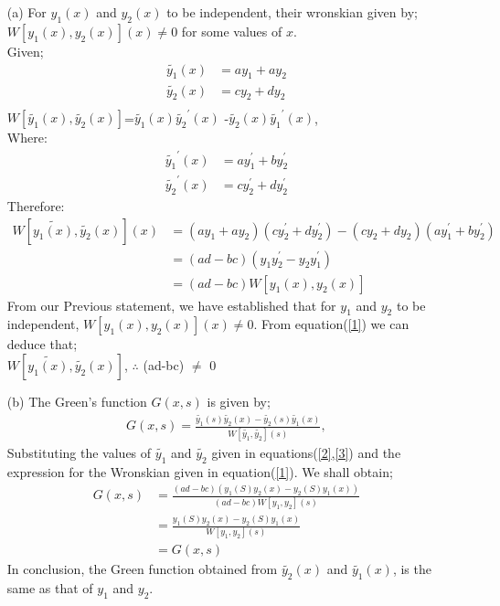 \documentclass[12pt,a4paper]{article}
\begin{document}
\begin{itemize}
\item[(a)]
For $y_{1}(x)$ and $y_{2}(x)$ to be independent, their wronskian given by; $W[y_{1}(x),y_{2}(x)](x) \neq 0$ for some values of $x$.\\
\newline
Given;
\begin{align}
\tilde{y_{1}}(x)&=ay_{1}+ay_{2}\\ \label{2}
\tilde{y_{2}}(x)&=cy_{2}+dy_{2} \\\label{3}
 \end{align}	
$W[\tilde{y_{1}}(x), \tilde{y_{2}}(x)]$=$\tilde{y_{1}}(x)\tilde{y_{2}}^{\prime}(x)$ -$\tilde{y_{2}}(x)\tilde{y_{1}}^{\prime}(x)$,\\
\newline
Where:	
\begin{align}
\tilde{y_{1}}^{\prime}(x)&=ay_{1}^{\prime}+by_{2}^{\prime}\\
\tilde{y_{2}}^{\prime}(x)&=cy_{2}^{\prime}+dy_{2}^{\prime}
\end{align}
Therefore:\\
\begin{align}
W[\tilde{y_{1}(x)},\tilde{y_{2}}(x)](x)&=(ay_{1}+ay_{2})(cy_{2}^{\prime}+dy_{2}^{\prime})-(cy_{2}+dy_{2})(ay_{1}^{\prime}+by_{2}^{\prime})\\
&=(ad-bc)(y_{1}y_{2}^{\prime}-y_{2}y_{1}^{\prime})\\
&=(ad-bc)W[y_{1}(x),y_{2}(x)]\label{1}
\end{align}
From our Previous statement, we have established that for $y_{1}$ and $y_{2}$ to be independent, $W[y_{1}(x),y_{2}(x)](x) \neq 0$. From equation(\ref{1}) we can deduce that;\\
\newline
$W[\tilde{y_{1}(x)},\tilde{y_{2}}(x)]$, $\therefore$ (ad-bc) $\neq$ 0

\item[(b)]The Green's function $G(x,s)$ is given by;
\begin{align*}
G(x,s)=\frac{\tilde{y_{1}}(s)\tilde{y_{2}}(x)-\tilde{y_{2}}(s)\tilde{y_{1}}(x)}{W[\tilde{y_{1}},\tilde{y_{2}}](s)},
\end{align*}
Substituting the values of $\tilde{y_{1}}$ and $\tilde{y_{2}}$ given in equations(\ref{2},\ref{3}) and the expression for the Wronskian given in equation(\ref{1}). We shall obtain;\\ 
\begin{align*}
G(x,s)&=\frac{(ad-bc)(y_{1}(S)y_{2}(x)-y_{2}(S)y_{1}(x))}{(ad-bc)W[y_{1},y_{2}](s)}\\
&=\frac{y_{1}(S)y_{2}(x)-y_{2}(S)y_{1}(x)}{W[y_{1},y_{2}](s)}\\
&=G(x,s)
\end{align*}
In conclusion, the Green function obtained from $\tilde{y_{2}}(x)$ and $\tilde{y_{1}}(x)$, is the same as that of $y_{1}$ and $y_{2}$.


\end{itemize}
\end{document}
